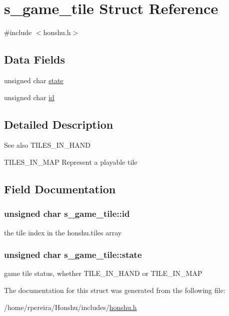 \hypertarget{structs__game__tile}{}\section{s\+\_\+game\+\_\+tile Struct Reference}
\label{structs__game__tile}


{\ttfamily \#include $<$honshu.\+h$>$}

\subsection*{Data Fields}
\begin{DoxyCompactItemize}
\item 
unsigned char \hyperlink{structs__game__tile_a61310f02007afba0e94c88a055ba5dde}{state}
\item 
unsigned char \hyperlink{structs__game__tile_acd35d3bb2304df44b36bc07ce9ca5178}{id}
\end{DoxyCompactItemize}


\subsection{Detailed Description}
\begin{DoxySeeAlso}{See also}
T\+I\+L\+E\+S\+\_\+\+I\+N\+\_\+\+H\+A\+ND 

T\+I\+L\+E\+S\+\_\+\+I\+N\+\_\+\+M\+AP Represent a playable tile 
\end{DoxySeeAlso}


\subsection{Field Documentation}
\subsubsection[{\texorpdfstring{id}{id}}]{\setlength{\rightskip}{0pt plus 5cm}unsigned char s\+\_\+game\+\_\+tile\+::id}\hypertarget{structs__game__tile_acd35d3bb2304df44b36bc07ce9ca5178}{}\label{structs__game__tile_acd35d3bb2304df44b36bc07ce9ca5178}
the tile index in the \textquotesingle{}honshu.\+tiles\textquotesingle{} array 
\subsubsection[{\texorpdfstring{state}{state}}]{\setlength{\rightskip}{0pt plus 5cm}unsigned char s\+\_\+game\+\_\+tile\+::state}\hypertarget{structs__game__tile_a61310f02007afba0e94c88a055ba5dde}{}\label{structs__game__tile_a61310f02007afba0e94c88a055ba5dde}
game tile status, whether T\+I\+L\+E\+\_\+\+I\+N\+\_\+\+H\+A\+ND or T\+I\+L\+E\+\_\+\+I\+N\+\_\+\+M\+AP 

The documentation for this struct was generated from the following file\+:\begin{DoxyCompactItemize}
\item 
/home/rpereira/\+Honshu/includes/\hyperlink{honshu_8h}{honshu.\+h}\end{DoxyCompactItemize}
